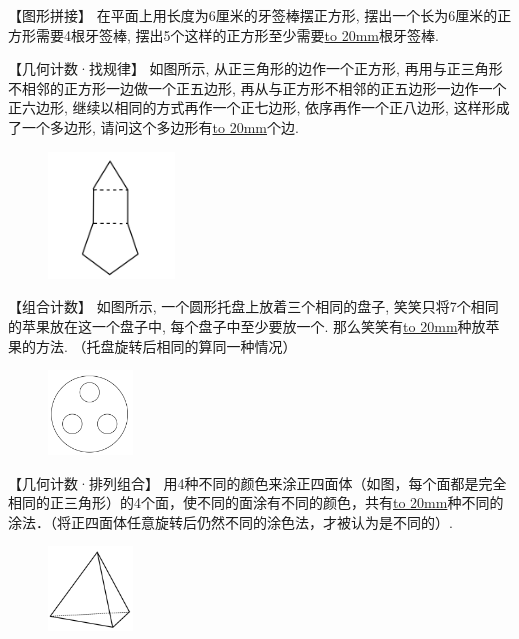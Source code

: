 \item {
    【图形拼接】
    在平面上用长度为6厘米的牙签棒摆正方形, 摆出一个长为6厘米的正方形需要4根牙签棒, 摆出5个这样的正方形至少需要\underline{\hbox to 20mm{}}根牙签棒. 
    \vspace{1cm}
}

\item {
    【几何计数·找规律】
    如图所示, 从正三角形的边作一个正方形, 再用与正三角形不相邻的正方形一边做一个正五边形, 再从与正方形不相邻的正五边形一边作一个正六边形, 继续以相同的方式再作一个正七边形, 依序再作一个正八边形, 这样形成了一个多边形, 请问这个多边形有\underline{\hbox to 20mm{}}个边. 
    \begin{figure}[H] 
        \centering
        \includegraphics[width=0.3\textwidth]{./pics/Chapter_4/2015_3.png}
    \end{figure}
}

\item {
    【组合计数】
    如图所示, 一个圆形托盘上放着三个相同的盘子, 笑笑只将7个相同的苹果放在这一个盘子中, 每个盘子中至少要放一个. 那么笑笑有\underline{\hbox to 20mm{}}种放苹果的方法. （托盘旋转后相同的算同一种情况）
    \begin{figure}[H] 
        \centering
        \includegraphics[width=0.2\textwidth]{./pics/Chapter_4/2015_4.png}
    \end{figure}
}

\item {
    【几何计数·排列组合】
    用4种不同的颜色来涂正四面体（如图，每个面都是完全相同的正三角形）的4个面，使不同的面涂有不同的颜色，共有\underline{\hbox to 20mm{}}种不同的涂法．（将正四面体任意旋转后仍然不同的涂色法，才被认为是不同的）.
    \begin{figure}[H] 
        \centering
        \includegraphics[width=0.2\textwidth]{./pics/Chapter_4/2010_1.png}
    \end{figure}
}

